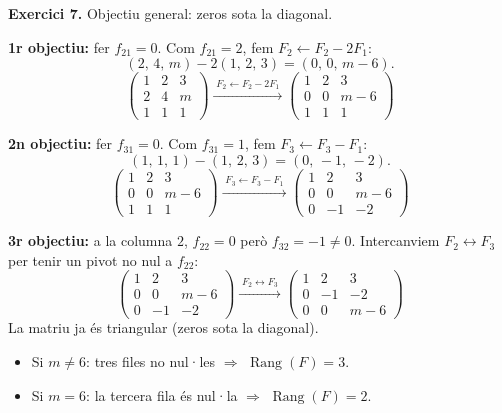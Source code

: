 \documentclass[12pt,a4paper]{article}
\newcommand{\blocInici}{%
  \par\nobreak\vspace{0pt}%
  \begin{minipage}[t]{\linewidth}%
}
\newcommand{\blocFi}{%
  \end{minipage}%
  \par
}
\newcommand{\gaussFletxa}[1]{%
  \mathrel{\xrightarrow{\;\scriptstyle #1\;}}%
}
\begin{document}
\vspace{0.55em}

%
\blocInici
\noindent\textbf{Exercici 7.}
Objectiu general: zeros sota la diagonal.

\textbf{1r objectiu:} fer $f_{21}=0$.
Com $f_{21}=2$, fem $F_2 \leftarrow F_2 - 2F_1$:
{\setlength{\arraycolsep}{3pt}%
\[
  (2,\,4,\,m) - 2(1,\,2,\,3) = (0,\,0,\,m-6).
\]
\[
  \begin{pmatrix} 1 & 2 & 3 \\ 2 & 4 & m \\ 1 & 1 & 1 \end{pmatrix}
  \gaussFletxa{F_2 \leftarrow F_2 - 2F_1}
  \begin{pmatrix} 1 & 2 & 3 \\ 0 & 0 & m-6 \\ 1 & 1 & 1 \end{pmatrix}
\]
}

\textbf{2n objectiu:} fer $f_{31}=0$.
Com $f_{31}=1$, fem $F_3 \leftarrow F_3 - F_1$:
{\setlength{\arraycolsep}{3pt}%
\[
  (1,\,1,\,1) - (1,\,2,\,3) = (0,\,-1,\,-2).
\]
\[
  \begin{pmatrix} 1 & 2 & 3 \\ 0 & 0 & m-6 \\ 1 & 1 & 1 \end{pmatrix}
  \gaussFletxa{F_3 \leftarrow F_3 - F_1}
  \begin{pmatrix} 1 & 2 & 3 \\ 0 & 0 & m-6 \\ 0 & -1 & -2 \end{pmatrix}
\]
}

\textbf{3r objectiu:} a la columna $2$, $f_{22}=0$ però $f_{32}=-1\neq 0$.
Intercanviem $F_2 \leftrightarrow F_3$ per tenir un pivot no nul a $f_{22}$:
{\setlength{\arraycolsep}{3pt}%
\[
  \begin{pmatrix} 1 & 2 & 3 \\ 0 & 0 & m-6 \\ 0 & -1 & -2 \end{pmatrix}
  \gaussFletxa{F_2 \leftrightarrow F_3}
  \begin{pmatrix} 1 & 2 & 3 \\ 0 & -1 & -2 \\ 0 & 0 & m-6 \end{pmatrix}
\]
}
La matriu ja és triangular (zeros sota la diagonal).
\begin{itemize}[leftmargin=1.2em,itemsep=0.2em]
  \item Si $m \neq 6$: tres files no nul·les $\Rightarrow$ $\operatorname{Rang}(F) = 3$.
  \item Si $m = 6$: la tercera fila és nul·la $\Rightarrow$ $\operatorname{Rang}(F) = 2$.
\end{itemize}
\blocFi
\end{document}
